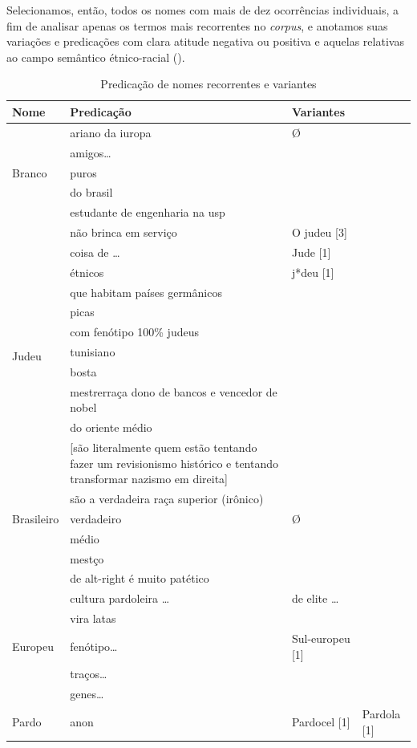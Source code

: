\documentclass[portuguese]{textolivre}
\begin{document}
Selecionamos, então, todos os nomes com mais de dez ocorrências individuais, a fim de analisar apenas os termos mais recorrentes no \emph{corpus}, e anotamos suas variações e predicações com clara atitude negativa ou positiva e aquelas relativas ao campo semântico étnico-racial ().

\begin{longtable}{llll}
\caption{Predicação de nomes recorrentes e variantes}
\label{tab2}
\\
\toprule
Nome & Predicação & Variantes & \\
\midrule
\multirow{5}{*}{Branco} & ariano da iuropa & Ø & \\ 
& amigos… \\ 
& puros\\ 
& do brasil\\ 
& estudante de engenharia na usp \\
\midrule
\multirow{11}{*}{Judeu} & não brinca em serviço & O judeu {[}3{]} & \\
& coisa de … & Jude {[}1{]} & \\ 
& étnicos & j*deu {[}1{]} & \\ 
& que habitam países germânicos\\ 
& picas\\ 
& com fenótipo 100\% judeus\\ 
& tunisiano\\ 
& bosta\\ 
& mestrerraça dono de bancos e vencedor de nobel\\ 
& do oriente médio\\ 
& \multicolumn{1}{p{7cm}}{{[}são literalmente quem estão tentando fazer um revisionismo histórico e tentando transformar nazismo em direita{]}} \\ 
& são a verdadeira raça superior (irônico) \\
\midrule
Brasileiro & verdadeiro & Ø & \\
 & médio \\
 & mestço \\
 & de alt-right é muito patético \\ 
 & cultura pardoleira … 
 & de elite … \\ 
 & vira latas \\
 \midrule
Europeu & fenótipo… & Sul-europeu {[}1{]} \\
 & traços…\\ 
 & genes… \\
 \midrule
Pardo & anon & Pardocel {[}1{]} & Pardola {[}1{]} \\

\end{longtable}
\end{document}
